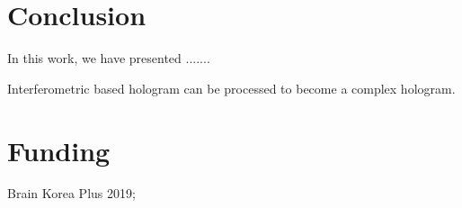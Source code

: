 \documentclass[9pt,twocolumn,twoside]{osajnl}
\begin{document}
\section{Conclusion}

In this work, we have presented .......

Interferometric based hologram can be processed to become a complex hologram.


\section{Funding}

Brain Korea Plus 2019; 




\end{document}
